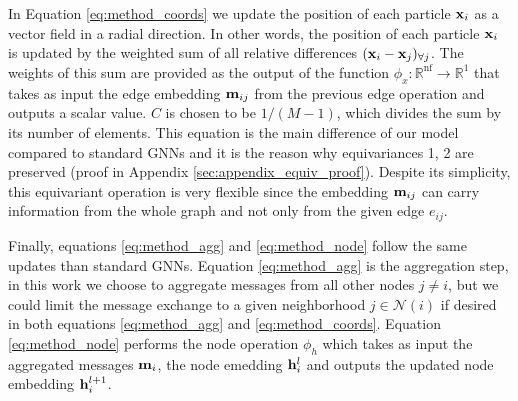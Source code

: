 In Equation \ref{eq:method_coords} we update the position of each particle $\mathbf{x}_i$ as a vector field in a radial direction. In other words, the position of each particle $\mathbf{x}_i $ is updated by the weighted sum of all relative differences $(\mathbf{x}_i - \mathbf{x}_j)_{\forall j}$. The weights of this sum are provided as the output of the function $\phi_x: \mathbb{R}^{\text{nf}} \rightarrow \mathbb{R}^1$ that takes as input the edge embedding $\mathbf{m}_{ij}$ from the previous edge operation and outputs a scalar value. $C$ is chosen to be $1/(M-1)$, which divides the sum by its number of elements. This equation is the main difference of our model compared to standard GNNs and it is the reason why equivariances 1, 2 are preserved (proof in Appendix \ref{sec:appendix_equiv_proof}). Despite its simplicity, this equivariant operation is very flexible since the embedding $\mathbf{m}_{ij}$ can carry information from the whole graph and not only from the given edge $e_{ij}$. 

Finally, equations \ref{eq:method_agg} and \ref{eq:method_node} follow the same updates than standard GNNs. Equation \ref{eq:method_agg} is the aggregation step, in this work we choose to aggregate messages from all other nodes $j\neq i$, but we could limit the message exchange to a given neighborhood $j \in \mathcal{N}(i)$ if desired in both equations \ref{eq:method_agg} and \ref{eq:method_coords}. Equation \ref{eq:method_node} performs the node operation $\phi_h$ which takes as input the aggregated messages $\mathbf{m}_i$, the node emedding $\mathbf{h}_i^{l}$ and outputs the updated node embedding $\mathbf{h}_i^{l+1}$.





